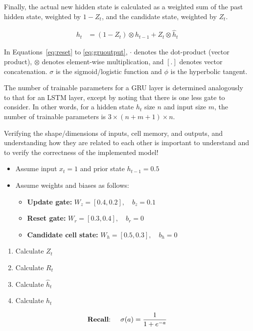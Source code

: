 Finally, the actual new hidden state is calculated as a weighted sum of the past hidden state, weighted by $1-Z_t$, and the candidate state, weighted by $Z_t$.

\begin{align}
h_t &= (1 - Z_t) \otimes h_{t-1} + Z_t \otimes \hat{h}_t \label{eq:gruoutput}
\end{align}

In Equations~\ref{eq:reset} to \ref{eq:gruoutput}, $\cdot$ denotes the dot-product (vector product), $\otimes$ denotes element-wise multiplication, and $[.]$ denotes vector concatenation.  $\sigma$ is the sigmoid/logistic function and $\phi$ is the hyperbolic tangent.

The number of trainable parameters for a GRU layer is determined analogously to that for an LSTM layer, except by noting that there is one less gate to consider. In other words, for a hidden state $h_t$ size $n$ and input size $m$, the number of trainable parameters is $3 \times (n+m+1) \times n$.

\begin{alertbox}
Verifying the shape/dimensions of inputs, cell memory, and outputs, and understanding how they are related to each other is important to understand and to verify the correctness of the implemented model!
\end{alertbox}

\begin{exerciseboxpaper}
\begin{itemize}
  \item Assume input $x_t = 1$ and prior state $h_{t-1}=0.5$
  \item Assume weights and biases as follows:
  \begin{itemize}
     \item {\bf Update gate:} $W_z = [0.4, 0.2], \quad b_z = 0.1$
     \item {\bf Reset gate:} $W_r = [0.3, 0.4], \quad b_r = 0$
     \item {\bf Candidate cell state:} $W_h = [0.5, 0.3], \quad b_h = 0$
  \end{itemize}
\end{itemize}
\begin{enumerate}
  \item Calculate $Z_t$ \hspace{2cm}
  \item Calculate $R_t$
  \item Calculate $\hat{h}_t$
  \item Calculate $h_t$
\end{enumerate}
\begin{align*}\text{{\bf Recall}: }\quad\sigma(a)=\frac{1}{1+e^{-a}}\end{align*}
\end{exerciseboxpaper}


